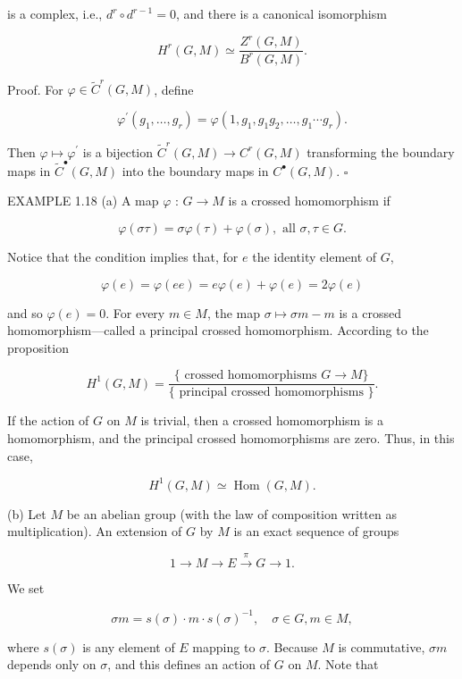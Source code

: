 \documentclass[10pt]{article}
\begin{document}
is a complex, i.e., $d^{r} \circ d^{r-1}=0$, and there is a canonical isomorphism

$$
H^{r}(G, M) \simeq \frac{Z^{r}(G, M)}{B^{r}(G, M)} .
$$

Proof. For $\varphi \in \tilde{C}^{r}(G, M)$, define

$$
\varphi^{\prime}\left(g_{1}, \ldots, g_{r}\right)=\varphi\left(1, g_{1}, g_{1} g_{2}, \ldots, g_{1} \cdots g_{r}\right) .
$$

Then $\varphi \mapsto \varphi^{\prime}$ is a bijection $\tilde{C}^{r}(G, M) \rightarrow C^{r}(G, M)$ transforming the boundary maps in $\tilde{C}^{\bullet}(G, M)$ into the boundary maps in $C^{\bullet}(G, M)$. \(\square\)

EXAMPLE 1.18 (a) A map $\varphi$ : $G \rightarrow M$ is a crossed homomorphism if

$$
\varphi(\sigma \tau)=\sigma \varphi(\tau)+\varphi(\sigma), \text { all } \sigma, \tau \in G .
$$

Notice that the condition implies that, for $e$ the identity element of $G$,

$$
\varphi(e)=\varphi(e e)=e \varphi(e)+\varphi(e)=2 \varphi(e)
$$

and so $\varphi(e)=0$. For every $m \in M$, the map $\sigma \mapsto \sigma m-m$ is a crossed homomorphism—called a principal crossed homomorphism. According to the proposition

$$
H^{1}(G, M)=\frac{\{\text { crossed homomorphisms } G \rightarrow M\}}{\{\text { principal crossed homomorphisms }\}} .
$$

If the action of $G$ on $M$ is trivial, then a crossed homomorphism is a homomorphism, and the principal crossed homomorphisms are zero. Thus, in this case,


\begin{equation*}
H^{1}(G, M) \simeq \operatorname{Hom}(G, M) . \tag{16}
\end{equation*}


(b) Let $M$ be an abelian group (with the law of composition written as multiplication). An extension of $G$ by $M$ is an exact sequence of groups

$$
1 \rightarrow M \rightarrow E \xrightarrow{\pi} G \rightarrow 1 .
$$

We set

$$
\sigma m=s(\sigma) \cdot m \cdot s(\sigma)^{-1}, \quad \sigma \in G, m \in M,
$$

where $s(\sigma)$ is any element of $E$ mapping to $\sigma$. Because $M$ is commutative, $\sigma m$ depends only on $\sigma$, and this defines an action of $G$ on $M$. Note that
\end{document}
